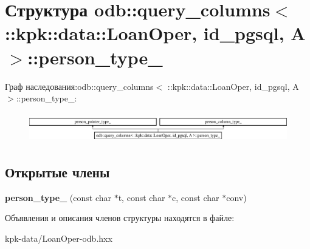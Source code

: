 \hypertarget{structodb_1_1query__columns_3_01_1_1kpk_1_1data_1_1_loan_oper_00_01id__pgsql_00_01_a_01_4_1_1person__type__}{}\section{Структура odb\+:\+:query\+\_\+columns$<$ \+:\+:kpk\+:\+:data\+:\+:Loan\+Oper, id\+\_\+pgsql, A $>$\+:\+:person\+\_\+type\+\_\+}
\label{structodb_1_1query__columns_3_01_1_1kpk_1_1data_1_1_loan_oper_00_01id__pgsql_00_01_a_01_4_1_1person__type__}
Граф наследования\+:odb\+:\+:query\+\_\+columns$<$ \+:\+:kpk\+:\+:data\+:\+:Loan\+Oper, id\+\_\+pgsql, A $>$\+:\+:person\+\_\+type\+\_\+\+:\begin{figure}[H]
\begin{center}
\leavevmode
\includegraphics[height=1.302326cm]{structodb_1_1query__columns_3_01_1_1kpk_1_1data_1_1_loan_oper_00_01id__pgsql_00_01_a_01_4_1_1person__type__}
\end{center}
\end{figure}
\subsection*{Открытые члены}
\begin{DoxyCompactItemize}
\item 
{\bfseries person\+\_\+type\+\_\+} (const char $\ast$t, const char $\ast$c, const char $\ast$conv)\hypertarget{structodb_1_1query__columns_3_01_1_1kpk_1_1data_1_1_loan_oper_00_01id__pgsql_00_01_a_01_4_1_1person__type___a799f456c4c744bbb76736cfdccec27e4}{}\label{structodb_1_1query__columns_3_01_1_1kpk_1_1data_1_1_loan_oper_00_01id__pgsql_00_01_a_01_4_1_1person__type___a799f456c4c744bbb76736cfdccec27e4}

\end{DoxyCompactItemize}


Объявления и описания членов структуры находятся в файле\+:\begin{DoxyCompactItemize}
\item 
kpk-\/data/Loan\+Oper-\/odb.\+hxx\end{DoxyCompactItemize}
